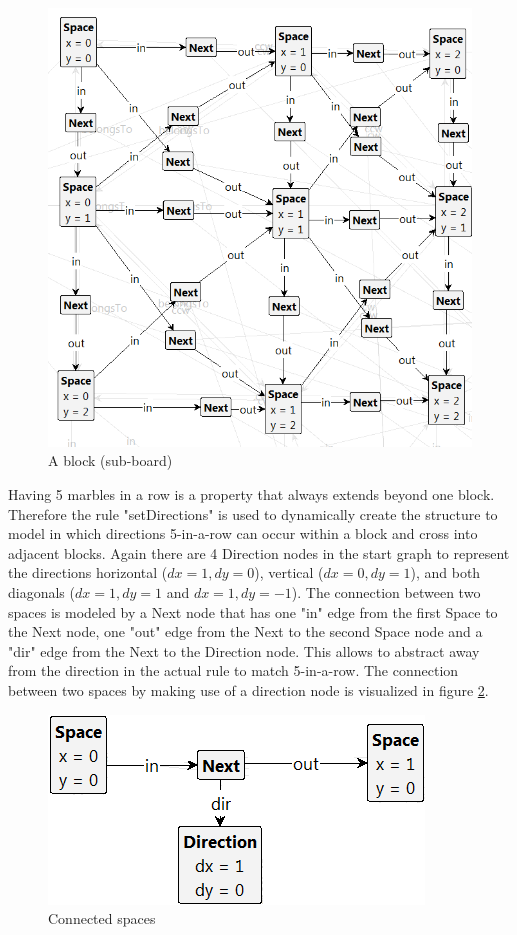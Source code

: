 \begin{figure}[!h]
    \centering
    \includegraphics[scale=0.25,clip]{Images/oneblockwithoutbelongs.PNG}
    \caption{A block (sub-board)}
    \label{fig:p2-block}
\end{figure}

\vspace{6pt}

Having 5 marbles in a row is a property that always extends beyond one block.
Therefore the rule "setDirections" is used to dynamically create the structure to model in which directions 5-in-a-row can occur within a block and cross into adjacent blocks.
Again there are 4 Direction nodes in the start graph to represent the directions horizontal ($dx=1,dy=0$), vertical ($dx=0,dy=1$), and both diagonals ($dx=1,dy=1$ and $dx=1,dy=-1$). 
The connection between two spaces is modeled by a Next node that has one "in" edge from the first Space to the Next node, one "out" edge from the Next to the second Space node and a "dir" edge from the Next to the Direction node. This allows to abstract away from the direction in the actual rule to match 5-in-a-row. The connection between two spaces by making use of a direction node is visualized in figure \ref{fig:cspaces}.

\begin{figure}[!h]
    \centering
    \includegraphics[scale=0.25,clip]{Images/TwoSpacesConnected.PNG}
    \caption{Connected spaces}
    \label{fig:cspaces}
\end{figure}


